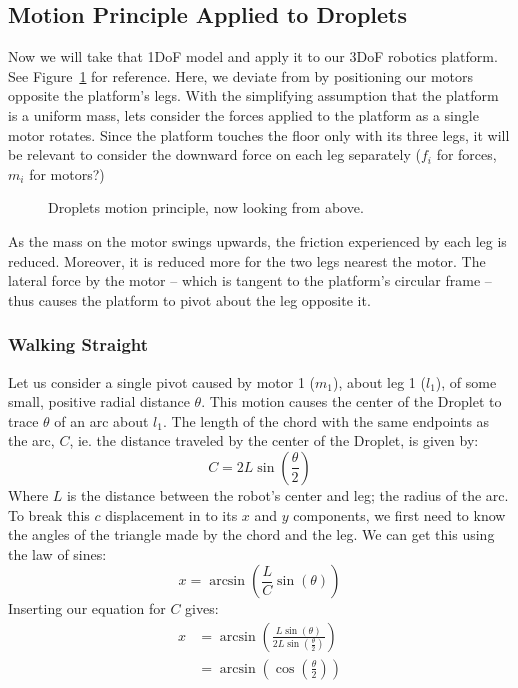 \documentclass[letterpaper, 10pt, conference]{ieeeconf}
\begin{document}
\subsection{Motion Principle Applied to Droplets}

Now we will take that 1DoF model and apply it to our 3DoF robotics platform. See Figure~\ref{dropletMotorDiagram} for reference. Here, we deviate from \cite{Vartholomeos2005} by positioning our motors opposite the platform's legs. With the simplifying assumption that the platform is a uniform mass, lets consider the forces applied to the platform as a single motor rotates. Since the platform touches the floor only with its three legs, it will be relevant to consider the downward force on each leg separately ($f_i$ for forces, $m_i$ for motors?)

\begin{figure}
\centering

\caption{Droplets motion principle, now looking from above.}
\label{dropletMotorDiagram}
\end{figure}

As the mass on the motor swings upwards, the friction experienced by each leg is reduced. Moreover, it is reduced more for the two legs nearest the motor. The lateral force by the motor -- which is tangent to the platform's circular frame -- thus causes the platform to pivot about the leg opposite it.



\subsubsection{Walking Straight}

Let us consider a single pivot caused by motor 1 ($m_1$), about leg 1 ($l_1$), of some small, positive radial distance $\theta$. This motion causes the center of the Droplet to trace $\theta$ of an arc about $l_1$. The length of the chord with the same endpoints as the arc, $C$, ie. the distance traveled by the center of the Droplet, is given by:
\[
C=2 L \sin\left(\frac{\theta}{2}\right)
\]
Where $L$ is the distance between the robot's center and leg; the radius of the arc. To break this $c$ displacement in to its $x$ and $y$ components, we first need to know the angles of the triangle made by the chord and the leg. We can get this using the law of sines:
\[
x = \arcsin\left(\frac{L}{C}\sin(\theta)\right) 
\]
Inserting our equation for $C$ gives:
\begin{align*}
x &=\arcsin\left(\frac{L\sin(\theta)}{2 L \sin(\frac{\theta}{2})}\right) \\
   &=\arcsin\left(\cos\left(\frac{\theta}{2}\right)\right)
\end{align*}
\end{document}
